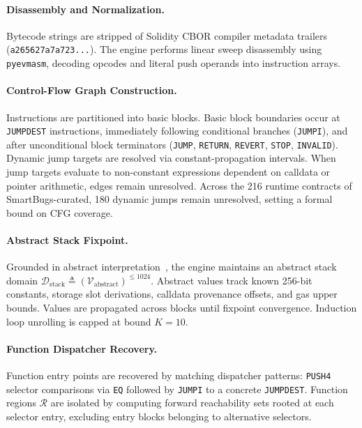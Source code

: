 \documentclass[pdflatex,sn-mathphys]{sn-jnl}
\theoremstyle{thmstyleone}
\theoremstyle{thmstyletwo}
\begin{document}
\paragraph{Disassembly and Normalization.} Bytecode strings are stripped of Solidity CBOR compiler metadata trailers (\texttt{a265627a7a723...}). The engine performs linear sweep disassembly using \texttt{pyevmasm}, decoding opcodes and literal push operands into instruction arrays.

\paragraph{Control-Flow Graph Construction.} Instructions are partitioned into basic blocks. Basic block boundaries occur at \texttt{JUMPDEST} instructions, immediately following conditional branches (\texttt{JUMPI}), and after unconditional block terminators (\texttt{JUMP}, \texttt{RETURN}, \texttt{REVERT}, \texttt{STOP}, \texttt{INVALID}). Dynamic jump targets are resolved via constant-propagation intervals. When jump targets evaluate to non-constant expressions dependent on calldata or pointer arithmetic, edges remain unresolved. Across the 216 runtime contracts of SmartBugs-curated, 180 dynamic jumps remain unresolved, setting a formal bound on CFG coverage.

\paragraph{Abstract Stack Fixpoint.} Grounded in abstract interpretation~\cite{cousot1977abstract}, the engine maintains an abstract stack domain $\mathcal{D}_{\mathrm{stack}} \triangleq (\mathcal{V}_{\mathrm{abstract}})^{\le 1024}$. Abstract values track known 256-bit constants, storage slot derivations, calldata provenance offsets, and gas upper bounds. Values are propagated across blocks until fixpoint convergence. Induction loop unrolling is capped at bound $K = 10$.

\paragraph{Function Dispatcher Recovery.} Function entry points are recovered by matching dispatcher patterns: \texttt{PUSH4} selector comparisons via \texttt{EQ} followed by \texttt{JUMPI} to a concrete \texttt{JUMPDEST}. Function regions $\mathcal{R}$ are isolated by computing forward reachability sets rooted at each selector entry, excluding entry blocks belonging to alternative selectors.
\end{document}
